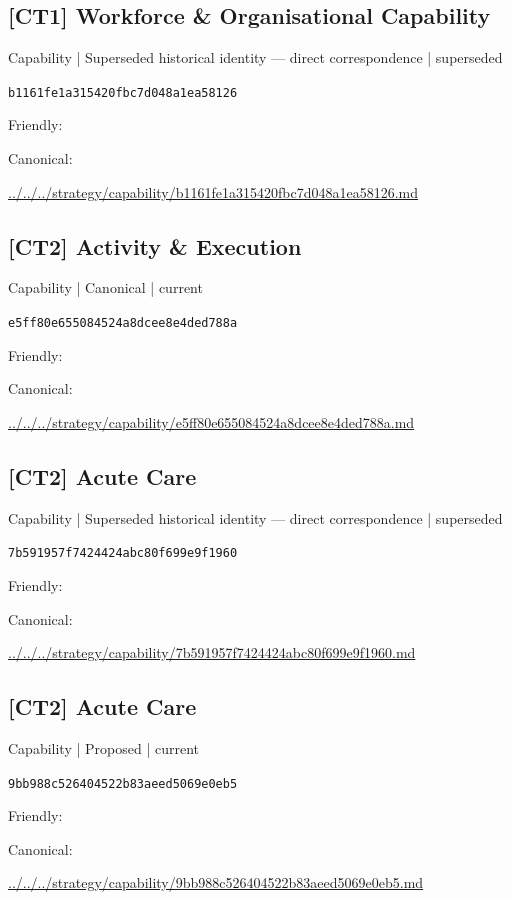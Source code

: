 \documentclass[10pt,a4paper]{article}
\begin{document}
\subsection*{[CT1] Workforce \& Organisational Capability}
{\small Capability | Superseded historical identity — direct correspondence | superseded}\par
\texttt{b1161fe1a315420fbc7d048a1ea58126}\par
Friendly: \par
Canonical: \par
{\footnotesize\url{../../../strategy/capability/b1161fe1a315420fbc7d048a1ea58126.md}}\par
\subsection*{[CT2] Activity \& Execution}
{\small Capability | Canonical | current}\par
\texttt{e5ff80e655084524a8dcee8e4ded788a}\par
Friendly: \par
Canonical: \par
{\footnotesize\url{../../../strategy/capability/e5ff80e655084524a8dcee8e4ded788a.md}}\par
\subsection*{[CT2] Acute Care}
{\small Capability | Superseded historical identity — direct correspondence | superseded}\par
\texttt{7b591957f7424424abc80f699e9f1960}\par
Friendly: \par
Canonical: \par
{\footnotesize\url{../../../strategy/capability/7b591957f7424424abc80f699e9f1960.md}}\par
\subsection*{[CT2] Acute Care}
{\small Capability | Proposed | current}\par
\texttt{9bb988c526404522b83aeed5069e0eb5}\par
Friendly: \par
Canonical: \par
{\footnotesize\url{../../../strategy/capability/9bb988c526404522b83aeed5069e0eb5.md}}\par
\end{document}
